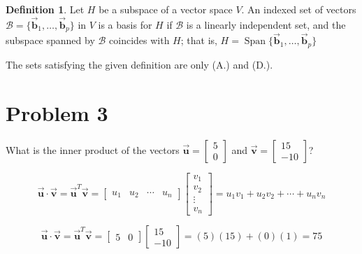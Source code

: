 \documentclass[letter,11pt]{article}
\theoremstyle{definition}
\newtheorem{definition}{Definition}[section]
\begin{document}
\begin{tcolorbox}[boxrule=1mm, width=(.9\linewidth),before=\hfill,after=\hfill,adjusted title={Problem 2 Solutions}]

\begin{definition}
Let $H$ be a subspace of a vector space $V$. An indexed set of vectors $\mathcal{B} = \{\vec{\boldsymbol{b}}_{1}, \ldots, \vec{\boldsymbol{b}}_p\}$ in $V$ is a basis for $H$ if $\mathcal{B}$ is a linearly independent set, and the subspace spanned by $\mathcal{B}$ coincides with $H$; that is, $H = \operatorname{Span} \{\vec{\boldsymbol{b}}_{1}, \ldots, \vec{\boldsymbol{b}}_p\}$
\end{definition}

\tcblower

The sets satisfying the given definition are only (A.) and (D.).
\end{tcolorbox}

\section{Problem 3}
What is the inner product of the vectors $\vec{\boldsymbol{u}}=\begin{bmatrix}5 \\ 0\end{bmatrix}$ and $\vec{\boldsymbol{v}}=\begin{bmatrix}15 \\ -10\end{bmatrix}$?

\begin{tcolorbox}[boxrule=1mm, width=(.9\linewidth),before=\hfill,after=\hfill,adjusted title={Problem 3 Solutions}]
    $$\vec{\boldsymbol{u}} \cdot \vec{\boldsymbol{v}}  = \vec{\boldsymbol{u}}^{T}\vec{\boldsymbol{v}} =\begin{bmatrix}
        u_1 & u_2 & \cdots & u_n
    \end{bmatrix} \begin{bmatrix}
        v_1\\ v_2\\ \vdots \\ v_{n}
    \end{bmatrix} = u_1v_1+u_2v_2 + \cdots + u_nv_n$$
    \tcblower

$$\vec{\boldsymbol{u}} \cdot \vec{\boldsymbol{v}}  = \vec{\boldsymbol{u}}^{T}\vec{\boldsymbol{v}} = \begin{bmatrix} 5 & 0 \end{bmatrix} \begin{bmatrix} 15\\ -10 \end{bmatrix} = (5)(15) + (0)(1) = \boxed{75}$$
\end{tcolorbox}
\end{document}
